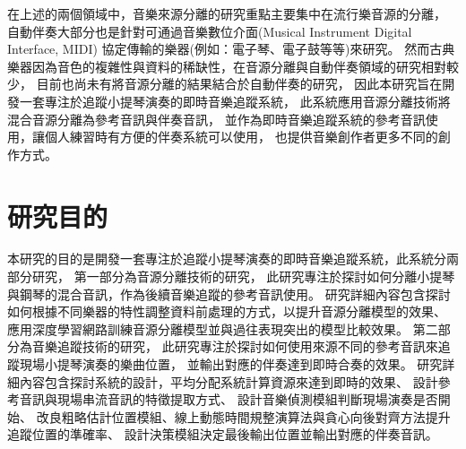 \documentclass[class=NCU_thesis, crop=false]{standalone}
\begin{document}
在上述的兩個領域中，音樂來源分離的研究重點主要集中在流行樂音源的分離，
自動伴奏大部分也是針對可通過音樂數位介面(Musical Instrument Digital Interface, MIDI)
協定傳輸的樂器(例如：電子琴、電子鼓等等)來研究。
然而古典樂器因為音色的複雜性與資料的稀缺性，在音源分離與自動伴奏領域的研究相對較少，
目前也尚未有將音源分離的結果結合於自動伴奏的研究，
因此本研究旨在開發一套專注於追蹤小提琴演奏的即時音樂追蹤系統，
此系統應用音源分離技術將混合音源分離為參考音訊與伴奏音訊，
並作為即時音樂追蹤系統的參考音訊使用，讓個人練習時有方便的伴奏系統可以使用，
也提供音樂創作者更多不同的創作方式。

\pagebreak

\section{研究目的}

本研究的目的是開發一套專注於追蹤小提琴演奏的即時音樂追蹤系統，此系統分兩部分研究，
第一部分為音源分離技術的研究，
此研究專注於探討如何分離小提琴與鋼琴的混合音訊，作為後續音樂追蹤的參考音訊使用。
研究詳細內容包含探討如何根據不同樂器的特性調整資料前處理的方式，以提升音源分離模型的效果、
應用深度學習網路訓練音源分離模型並與過往表現突出的模型比較效果。
第二部分為音樂追蹤技術的研究，
此研究專注於探討如何使用來源不同的參考音訊來追蹤現場小提琴演奏的樂曲位置，
並輸出對應的伴奏達到即時合奏的效果。
研究詳細內容包含探討系統的設計，平均分配系統計算資源來達到即時的效果、
設計參考音訊與現場串流音訊的特徵提取方式、
設計音樂偵測模組判斷現場演奏是否開始、
改良粗略估計位置模組、線上動態時間規整演算法與貪心向後對齊方法提升追蹤位置的準確率、
設計決策模組決定最後輸出位置並輸出對應的伴奏音訊。
\end{document}
